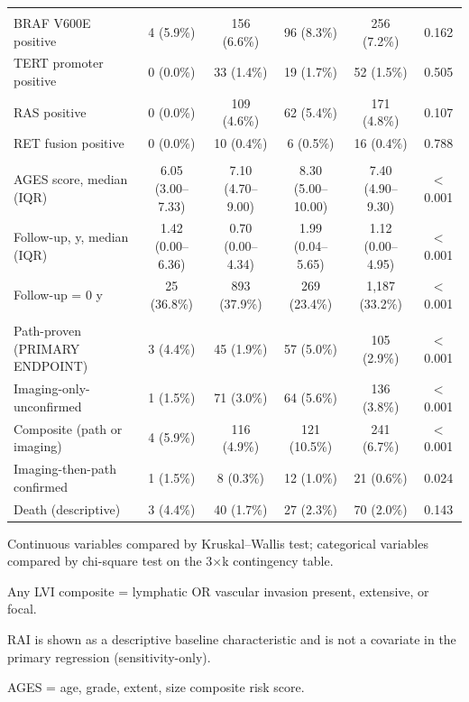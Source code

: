 \begin{landscape}
\begin{table}[htbp]
\begin{threeparttable}
\begin{tabular}{@{}lccccc@{}}
\addlinespace
\multicolumn{6}{l}{\textit{Molecular markers}} \\
\quad BRAF V600E positive & 4 (5.9\%) & 156 (6.6\%) & 96 (8.3\%) & 256 (7.2\%) & 0.162 \\
\quad TERT promoter positive & 0 (0.0\%) & 33 (1.4\%) & 19 (1.7\%) & 52 (1.5\%) & 0.505 \\
\quad RAS positive & 0 (0.0\%) & 109 (4.6\%) & 62 (5.4\%) & 171 (4.8\%) & 0.107 \\
\quad RET fusion positive & 0 (0.0\%) & 10 (0.4\%) & 6 (0.5\%) & 16 (0.4\%) & 0.788 \\
\addlinespace
\multicolumn{6}{l}{\textit{Risk score and follow-up}} \\
\quad AGES score, median (IQR) & 6.05 (3.00--7.33) & 7.10 (4.70--9.00) & 8.30 (5.00--10.00) & 7.40 (4.90--9.30) & $<$0.001 \\
\quad Follow-up, y, median (IQR) & 1.42 (0.00--6.36) & 0.70 (0.00--4.34) & 1.99 (0.04--5.65) & 1.12 (0.00--4.95) & $<$0.001 \\
\quad Follow-up = 0 y & 25 (36.8\%) & 893 (37.9\%) & 269 (23.4\%) & 1{,}187 (33.2\%) & $<$0.001 \\
\addlinespace
\multicolumn{6}{l}{\textit{Recurrence}} \\
\quad Path-proven (PRIMARY ENDPOINT) & 3 (4.4\%) & 45 (1.9\%) & 57 (5.0\%) & 105 (2.9\%) & $<$0.001 \\ %
\quad Imaging-only-unconfirmed & 1 (1.5\%) & 71 (3.0\%) & 64 (5.6\%) & 136 (3.8\%) & $<$0.001 \\
\quad Composite (path or imaging) & 4 (5.9\%) & 116 (4.9\%) & 121 (10.5\%) & 241 (6.7\%) & $<$0.001 \\
\quad Imaging-then-path confirmed & 1 (1.5\%) & 8 (0.3\%) & 12 (1.0\%) & 21 (0.6\%) & 0.024 \\
\quad Death (descriptive) & 3 (4.4\%) & 40 (1.7\%) & 27 (2.3\%) & 70 (2.0\%) & 0.143 \\
\bottomrule
\end{tabular}
\begin{tablenotes}
\scriptsize
\item Continuous variables compared by Kruskal--Wallis test; categorical variables compared by chi-square test on the 3$\times$k contingency table.
\item[\textsuperscript{a}] Any LVI composite = lymphatic OR vascular invasion present, extensive, or focal.
\item[\textsuperscript{b}] RAI is shown as a descriptive baseline characteristic and is not a covariate in the primary regression (sensitivity-only).
\item AGES = age, grade, extent, size composite risk score.
\end{tablenotes}
\end{threeparttable}
\end{table}
\end{landscape}


